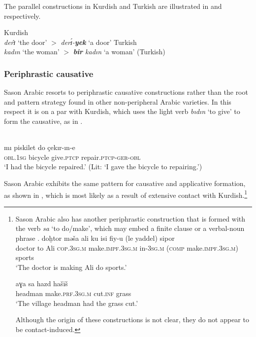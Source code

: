 \documentclass[output=paper]{langsci/langscibook}
\begin{document}
\noindent The parallel constructions in Kurdish and Turkish are illustrated in  and  respectively.

\begin{exe}
\ex \label{defkr} Kurdish\\	\textit{derɪ}̂ `the door' 	$>$ \textit{derɪ́-\textbf{yek}} `a door'
\ex \label{deftk} Turkish\\	\textit{kadın} `the woman' $>$ \textit{\textbf{bir} kadın} `a woman' (Turkish)
\end{exe}

 
\subsubsection{Periphrastic causative}

Sason Arabic resorts to periphrastic causative constructions rather than the root and pattern strategy found in other non-peripheral Arabic varieties. In this respect it is on a par with Kurdish, which uses the light verb \textit{bıdın} ‘to give’ to form the causative, as in . 

\begin{exe}
\ex \label{perrk}
\\
\gll  	mı         piskilet      	   do      	çekır-ın-e	\\
        \textsc{obl.1sg} bicycle  give.\textsc{ptcp}   repair.\textsc{ptcp-ger-obl}	 \\
        \glt `I had the bicycle repaired.' (Lit: `I gave the bicycle to repairing.')
\end{exe}
										
Sason Arabic exhibits the same pattern for causative and applicative formation, as shown in , which is most likely as a result of extensive contact with Kurdish.\footnote{Sason Arabic also has another periphrastic construction that is formed with the verb \textit{sa} `to do/make', which may embed a finite clause  or a verbal-noun phrase . 
\ea \label{make} 
\ea 
\label{makefin}  \gll doḫtor mə\v{s}a ali ku isi fiy-u (le yaddel) sipor \\
		doctor to Ali \textsc{cop.3sg.m} make.\textsc{impf.3sg.m} in-\textsc{3sg.m} (\textsc{comp} make.\textsc{impf.3sg.m}) sports\\\glt `The doctor is making Ali do sports.' 
	
		\ex \label{makeinf} \gll aɣa sa hazd ha\v{s}ī\v{s}\\
		headman make.\textsc{prf.3sg.m} cut.\textsc{inf} grass  \\
		\glt 	`The village headman had the grass cut.'
\z
\z

\noindent Although the origin of these constructions is not clear, they do not appear to be contact-induced.}
\end{document}

